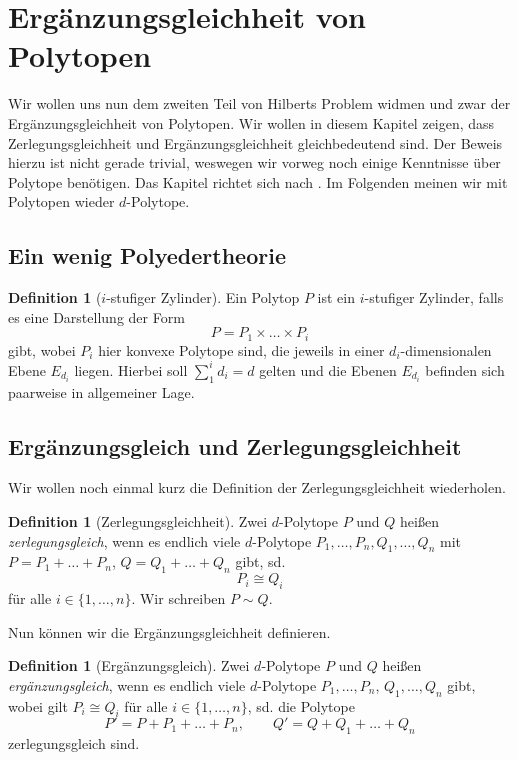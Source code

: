 \documentclass[11pt,titlepage]{article}
\theoremstyle{definition}
\newtheorem{definition}[theorem]{Definition}
\theoremstyle{remark}
\begin{document}
	\section{Ergänzungsgleichheit von Polytopen}
	
	Wir wollen uns nun dem zweiten Teil von Hilberts Problem widmen und zwar der 
	Ergänzungsgleichheit von Polytopen. Wir wollen in diesem Kapitel zeigen, dass 
	Zerlegungsgleichheit und Ergänzungsgleichheit gleichbedeutend sind. Der 
	Beweis hierzu ist nicht gerade trivial, weswegen wir vorweg noch einige 
	Kenntnisse über Polytope benötigen. Das Kapitel richtet sich nach 
	\cite{Hadwiger}. 
	Im Folgenden meinen wir mit Polytopen wieder $d$-Polytope. 
	
	\subsection{Ein wenig Polyedertheorie}
	
	
	
	\begin{definition}[$i$-stufiger Zylinder]
		Ein Polytop $P$ ist ein $i$-stufiger Zylinder, falls es eine Darstellung 
		der Form
		\[P=P_1 \times\ldots\times P_i\]
		gibt, wobei $P_i$ hier konvexe Polytope sind, die jeweils in einer $d_i$-dimensionalen Ebene $E_{d_i}$ liegen. Hierbei soll $\sum_1^i d_i =d$
		gelten und die Ebenen $E_{d_i}$ befinden sich paarweise in allgemeiner Lage.
	\end{definition}

	\subsection{Ergänzungsgleich und Zerlegungsgleichheit}
	
	Wir wollen noch einmal kurz die Definition der Zerlegungsgleichheit wiederholen.
	
	\begin{definition}[Zerlegungsgleichheit]
		Zwei $d$-Polytope $P$ und $Q$ heißen \textsl{zerlegungsgleich}, wenn es endlich viele $d$-Polytope 
		$P_1,\ldots,P_n,Q_1,\ldots,Q_n$ mit $P=P_1 +\ldots +P_n$,  $Q=Q_1 +\ldots+Q_n$ 
		gibt, sd. 
		\[P_i\cong Q_i\]
		für alle $i\in\{1,\ldots,n\}$. Wir schreiben $P\sim Q$.
	\end{definition}
	
	Nun können wir die Ergänzungsgleichheit definieren.
	
	\begin{definition}[Ergänzungsgleich]
		Zwei $d$-Polytope $P$ und $Q$ heißen \textsl{ergänzungsgleich}, wenn es endlich viele $d$-Polytope 
		$P_1,\ldots,P_n$, $Q_1,\ldots,Q_n$ gibt, wobei gilt $P_i\cong Q_i$ für alle $i\in\{1,\ldots,n\}$, sd. die Polytope
		\[P'=P+P_1+\ldots+P_n,\qquad Q'=Q+Q_1+\ldots+Q_n\]
		zerlegungsgleich sind.
	\end{definition}
	
\end{document}
